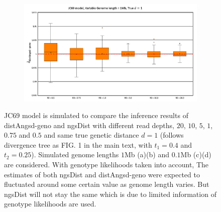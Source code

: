 \documentclass{article}
\begin{document}
\begin{figure}[h]
\begin{subfigure}[b]{0.475\textwidth}
         \caption{}
         \label{fig:NGSdist}
     \end{subfigure}
     \begin{subfigure}[b]{0.475\textwidth}
         \centering
         \includegraphics[width=\textwidth]{distAngsd-geno.png}
         \caption{}
         \label{fig:distAngsd-geno}
     \end{subfigure}
    \vspace{0.5cm}
    \caption{JC69 model is simulated to compare the inference results of distAngsd-geno and ngsDist with different read depths, $20$, $10$, $5$, $1$, $0.75$ and $0.5$ and same true genetic distance $d=1$ (follows divergence tree as FIG. 1 in the main text, with $t_1=0.4$ and $t_2 = 0.25$). Simulated genome lengths $1$Mb (a)(b) and $0.1$Mb (c)(d) are considered. With genotype likelihoods taken into account, The estimates of both ngsDist and distAngsd-geno were expected to fluctuated around some certain value as genome length varies. But ngsDist will not stay the same which is due to limited information of genotype likelihoods are used.}
    \label{fig:Geno2DSFSNGSDistDepth}
\end{figure}


\end{document}
